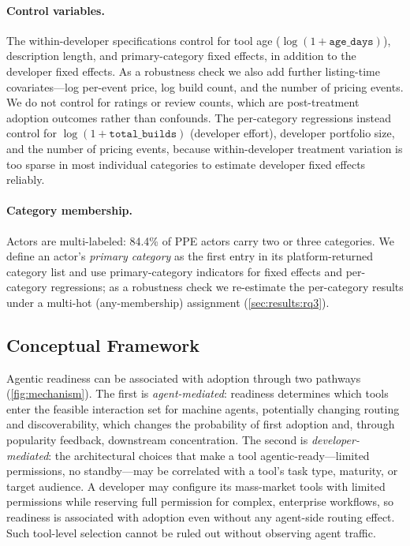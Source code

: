 \paragraph{Control variables.}
The within-developer specifications control for tool age
($\log(1 + \texttt{age\_days})$), description length, and primary-category fixed
effects, in addition to the developer fixed effects. As a robustness check we
also add further listing-time covariates---log per-event price, log build count,
and the number of pricing events. We do not control for ratings or review
counts, which are post-treatment adoption outcomes rather than confounds. The
per-category regressions instead control for $\log(1 + \texttt{total\_builds})$
(developer effort), developer portfolio size, and the number of pricing events,
because within-developer treatment variation is too sparse in most individual
categories to estimate developer fixed effects reliably.

\paragraph{Category membership.}
Actors are multi-labeled: 84.4\% of PPE actors carry two or three categories.
We define an actor's \emph{primary category} as the first entry in its
platform-returned category list and use primary-category indicators for fixed
effects and per-category regressions; as a robustness check we re-estimate the
per-category results under a multi-hot (any-membership) assignment
(\autoref{sec:results:rq3}).

\subsection{Conceptual Framework}
\label{sec:framework}

Agentic readiness can be associated with adoption through two pathways
(\autoref{fig:mechanism}). The first is \emph{agent-mediated}: readiness
determines which tools enter the feasible interaction set for machine agents,
potentially changing routing and discoverability, which changes the probability
of first adoption and, through popularity feedback, downstream concentration.
The second is \emph{developer-mediated}: the architectural choices that make a
tool agentic-ready---limited permissions, no standby---may be correlated with a
tool's task type, maturity, or target audience. A developer may configure its
mass-market tools with limited permissions while reserving full permission for
complex, enterprise workflows, so readiness is associated with adoption even
without any agent-side routing effect. Such tool-level selection cannot be
ruled out without observing agent traffic.

